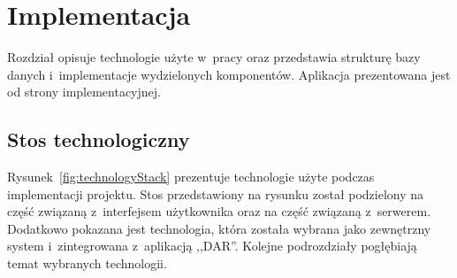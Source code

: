 \chapter{Implementacja}
\label{cha:implementacja}
Rozdział opisuje technologie użyte w~pracy oraz przedstawia strukturę bazy danych i~implementacje wydzielonych komponentów. Aplikacja prezentowana jest od strony implementacyjnej. 

\section{Stos technologiczny}
\label{sec:stosTechnologiczny}
Rysunek~\ref{fig:technologyStack} prezentuje technologie użyte podczas implementacji projektu. Stos przedstawiony na rysunku został podzielony na część związaną z~interfejsem użytkownika oraz na część związaną z~serwerem. Dodatkowo pokazana jest technologia, która została wybrana jako zewnętrzny system i~zintegrowana z~aplikacją ,,DAR''. Kolejne podrozdziały pogłębiają temat wybranych technologii.
